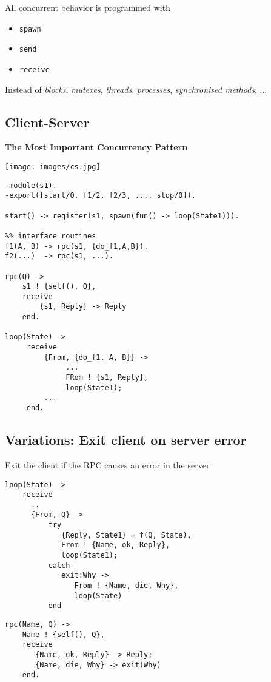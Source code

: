 \documentclass[12pt]{article}
\begin{document}
\begin{itemize}
All concurrent behavior is programmed with

\begin{itemize}
\item \verb+spawn+
\item \verb+send+
\item \verb+receive+
\end{itemize}

Instead of {\sl blocks}, {\sl mutexes}, {\sl threads}, {\sl
  processes}, {\sl synchronised methods}, ...

\subsection{Client-Server}

{\bf The Most Important Concurrency Pattern}

\texttt{[image: images/cs.jpg]}

\begin{verbatim}
-module(s1).
-export([start/0, f1/2, f2/3, ..., stop/0]).

start() -> register(s1, spawn(fun() -> loop(State1))).

%% interface routines
f1(A, B) -> rpc(s1, {do_f1,A,B}).
f2(...)  -> rpc(s1, ...).

rpc(Q) ->
    s1 ! {self(), Q},
    receive
        {s1, Reply} -> Reply
    end.
    
loop(State) ->
     receive
         {From, {do_f1, A, B}} ->
              ...
              FRom ! {s1, Reply},
              loop(State1);
         ...
     end.
\end{verbatim}

\subsection{Variations: Exit client on server error}

Exit the client if the RPC causes an error in the server

\begin{verbatim}
loop(State) ->
    receive
      ..
      {From, Q} ->    
          try  
             {Reply, State1} = f(Q, State),
             From ! {Name, ok, Reply},
             loop(State1);
          catch 
             exit:Why ->
                From ! {Name, die, Why},
                loop(State)
          end
\end{verbatim}

\begin{verbatim}
rpc(Name, Q) ->
    Name ! {self(), Q},
    receive
       {Name, ok, Reply} -> Reply;
       {Name, die, Why} -> exit(Why)
    end.
\end{verbatim}


\end{itemize}
\end{document}
